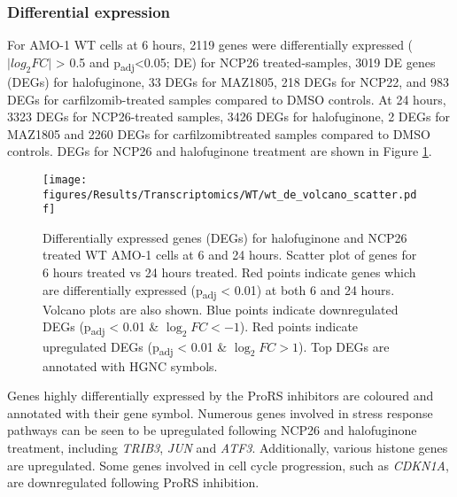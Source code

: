 \subsubsection{Differential expression}
For AMO-1 WT cells at 6 hours, 2119 genes were differentially expressed ($\lvert log_{2}FC \rvert$ > 0.5 and p\textsubscript{adj}<0.05; DE) for NCP26 treated-samples, 3019 DE genes (DEGs) for halofuginone, 33 DEGs for MAZ1805, 218 DEGs for NCP22, and 983 DEGs for carfilzomib-treated samples compared to DMSO controls.
At 24 hours, 3323 DEGs for NCP26-treated samples, 3426 DEGs for halofuginone, 2 DEGs for MAZ1805 and 2260 DEGs for carfilzomibtreated samples compared to DMSO controls.
DEGs for NCP26 and halofuginone treatment are shown in Figure \ref{fig:wt_de}.
%
\begin{figure}[htb]
\centering
\texttt{[image: figures/Results/Transcriptomics/WT/wt\_de\_volcano\_scatter.pdf]}
\caption[Differentially expressed genes WT AMO-1 cells]{Differentially expressed genes (DEGs) for halofuginone and NCP26 treated WT AMO-1 cells at 6 and 24 hours.
Scatter plot of genes for 6 hours treated vs 24 hours treated.
Red points indicate genes which are differentially expressed (p\textsubscript{adj} < 0.01) at both 6 and 24 hours.
Volcano plots are also shown.
Blue points indicate downregulated DEGs (p\textsubscript{adj} < 0.01 \& $\log_{2}FC < -1$).
Red points indicate upregulated DEGs (p\textsubscript{adj} < 0.01 \& $\log_{2}FC > 1$).
Top DEGs are annotated with HGNC symbols.
}
\label{fig:wt_de}
\end{figure}
Genes highly differentially expressed by the ProRS inhibitors are coloured and annotated with their gene symbol.
Numerous genes involved in stress response pathways can be seen to be upregulated following NCP26 and halofuginone treatment, including \textit{TRIB3}, \textit{JUN} and \textit{ATF3}.
Additionally, various histone genes are upregulated.
Some genes involved in cell cycle progression, such as \textit{CDKN1A}, are downregulated following ProRS inhibition.

